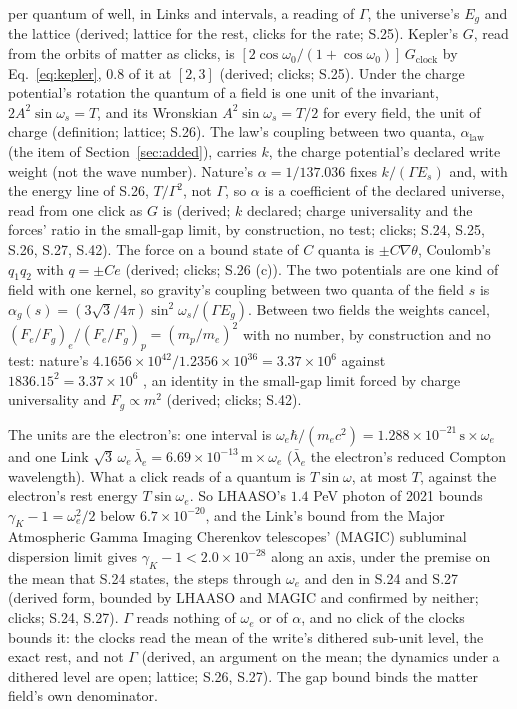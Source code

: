 \documentclass[pdflatex,sn-mathphys-num]{sn-jnl}
\newcommand{\den}{\mathrm{den}}
\theoremstyle{thmstyleone}
\theoremstyle{thmstyletwo}
\begin{document}
per quantum of well, in Links and intervals, a reading of $\Gamma$, the universe's $E_g$ and the lattice (derived; lattice for the rest, clicks for the rate; S.25). Kepler's $G$, read from the orbits of matter as clicks, is $[2\cos\omega_0 / (1 + \cos\omega_0)]\,G_{\mathrm{clock}}$ by Eq.~\eqref{eq:kepler}, $0.8$ of it at $[2, 3]$ (derived; clicks; S.25). Under the charge potential's rotation the quantum of a field is one unit of the invariant, $2A^2\sin\omega_s = T$, and its Wronskian $A^2\sin\omega_s = T / 2$ for every field, the unit of charge (definition; lattice; S.26). The law's coupling between two quanta, $\alpha_{\mathrm{law}}$ (the item of Section~\ref{sec:added}), carries $k$, the charge potential's declared write weight (not the wave number). Nature's $\alpha = 1 / 137.036$ \cite{codata} fixes $k / (\Gamma E_s)$ and, with the energy line of S.26, $T / \Gamma^2$, not $\Gamma$, so $\alpha$ is a coefficient of the declared universe, read from one click as $G$ is (derived; $k$ declared; charge universality and the forces' ratio in the small-gap limit, by construction, no test; clicks; S.24, S.25, S.26, S.27, S.42). The force on a bound state of $C$ quanta is $\pm C\nabla\theta$, Coulomb's $q_1 q_2$ with $q = \pm Ce$ (derived; clicks; S.26 (c)). The two potentials are one kind of field with one kernel, so gravity's coupling between two quanta of the field $s$ is $\alpha_g(s) = (3\sqrt 3 / 4\pi)\sin^2\omega_s / (\Gamma E_g)$. Between two fields the weights cancel, $(F_e / F_g)_e / (F_e / F_g)_p = (m_p / m_e)^2$ with no number, by construction and no test: nature's $4.1656 \times 10^{42} / 1.2356 \times 10^{36} = 3.37 \times 10^6$ against $1836.15^2 = 3.37 \times 10^6$ \cite{codata}, an identity in the small-gap limit forced by charge universality and $F_g \propto m^2$ (derived; clicks; S.42).

The units are the electron's: one interval is $\omega_e\hbar / (m_e c^2) = 1.288 \times 10^{-21}\,\mathrm{s} \times \omega_e$ \cite{codata} and one Link $\sqrt 3\,\omega_e\,\bar\lambda_e = 6.69 \times 10^{-13}\,\mathrm{m} \times \omega_e$ ($\bar\lambda_e$ the electron's reduced Compton wavelength). What a click reads of a quantum is $T\sin\omega$, at most $T$, against the electron's rest energy $T\sin\omega_e$. So LHAASO's $1.4$ PeV photon of 2021 \cite{lhaaso} bounds $\gamma_K - 1 = \omega_e^2 / 2$ below $6.7 \times 10^{-20}$, and the Link's bound from the Major Atmospheric Gamma Imaging Cherenkov telescopes' (MAGIC) subluminal dispersion limit \cite{magic} gives $\gamma_K - 1 < 2.0 \times 10^{-28}$ along an axis, under the premise on the mean that S.24 states, the steps through $\omega_e$ and $\den$ in S.24 and S.27 (derived form, bounded by LHAASO and MAGIC and confirmed by neither; clicks; S.24, S.27). $\Gamma$ reads nothing of $\omega_e$ or of $\alpha$, and no click of the clocks bounds it: the clocks read the mean of the write's dithered sub-unit level, the exact rest, and not $\Gamma$ (derived, an argument on the mean; the dynamics under a dithered level are open; lattice; S.26, S.27). The gap bound binds the matter field's own denominator.
\end{document}
